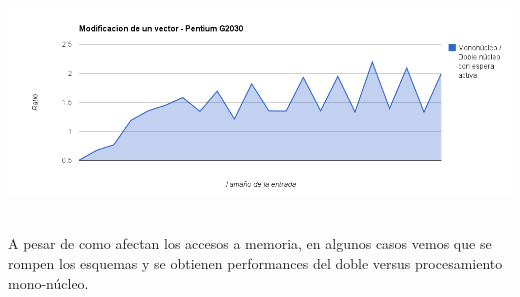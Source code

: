 	\begin{center}
	    \includegraphics[height=6cm]{images/g2030_vectorsum.png}
	\end{center}

	A pesar de como afectan los accesos a memoria, en algunos casos vemos que se rompen los esquemas y se obtienen performances del doble versus procesamiento mono-núcleo.

